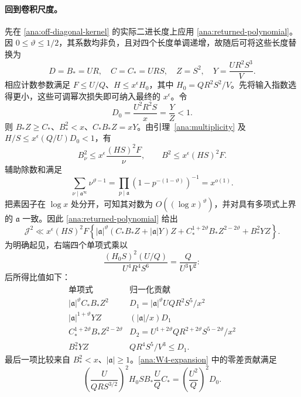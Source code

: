 \paragraph{回到卷积尺度。}
先在 \eqref{ana:off-diagonal-kernel} 的实际二进长度上应用 \eqref{ana:returned-polynomial}。因 $0\le\vartheta\le1/2$，其系数均非负，且对四个长度单调递增，故随后可将这些长度替换为
\begin{equation}\label{ana:scale-substitution}
 D=B_*=UR,\quad C=C_*=URS,\quad Z=S^2,\quad
 Y=\frac{UR^2S^3}{V}.
\end{equation}
相应计数参数满足 $F\le U/Q$、$H\le x^\epsilon H_0$，其中 $H_0=QR^2S^2/V$。先将输入指数选得更小，这些可调幂次损失即可纳入最终的 $x^\epsilon$。令
\[
 D_0=\frac{U^2R^2S}{x}=\frac YZ<1.
\]
则 $B_*Z\ge C_*$、$B_*^2<x$、$C_*B_*Z=xY$。由引理~\ref{ana:multiplicity} 及 $H/S\le x^\epsilon(Q/U)D_0<1$，有
\begin{equation}\label{ana:norm-insertion}
 B_\nu^2\le x^\epsilon\frac{(HS)^2F}{\nu},\qquad
 B^2\le x^\epsilon(HS)^2F.
\end{equation}
辅助除数和满足
\[
 \sum_{\nu\mid\mathfrak a^\infty}\nu^{\vartheta-1}
 =\prod_{p\mid\mathfrak a}(1-p^{-(1-\vartheta)})^{-1}
 =x^{o(1)}.
\]
把素因子在 $\log x$ 处分开，可知其对数为 $O((\log x)^\vartheta)$，并对具有多项式上界的 $\mathfrak a$ 一致。因此 \eqref{ana:returned-polynomial} 给出
\begin{equation}\label{ana:J-reduced}
 \mathcal J^2\ll x^\epsilon(HS)^2F
 \left\{
 |\mathfrak a|^\vartheta(C_*B_*Z+|\mathfrak a|Y)Z
 +C_*^{1+2\vartheta}B_*Z^{2-2\vartheta}
 +B_*^2YZ\right\}.
\end{equation}
为明确起见，右端四个单项式乘以
\[
 \frac{(H_0S)^2(U/Q)}{U^4R^4S^6}
                  =\frac{Q}{U^3V^2}:
\]
后所得比值如下：
\begin{equation}\label{ana:ratio-table}
\begin{array}{c|c}
 \text{单项式}&\text{归一化贡献}\\ \hline
 |\mathfrak a|^\vartheta C_*B_*Z^2
     &D_1=|\mathfrak a|^\vartheta UQR^2S^5/x^2\\
 |\mathfrak a|^{1+\vartheta}YZ
     &(|\mathfrak a|/x)D_1\\
 C_*^{1+2\vartheta}B_*Z^{2-2\vartheta}
     &D_2=U^{1+2\vartheta}QR^{2+2\vartheta}S^{5-2\vartheta}/x^2\\
 B_*^2YZ&QR^4S^5/V^3\le D_1.
\end{array}
\end{equation}
最后一项比较来自 $B_*^2<x$、$|\mathfrak a|\ge1$。\eqref{ana:W4-expansion} 中的零差贡献满足
\[
 \left(\frac{U}{QRS^{3/2}}\right)^2H_0SB_*\frac UQ C_*
       =\left(\frac{U^2}{Q}\right)^2D_0.
\]
